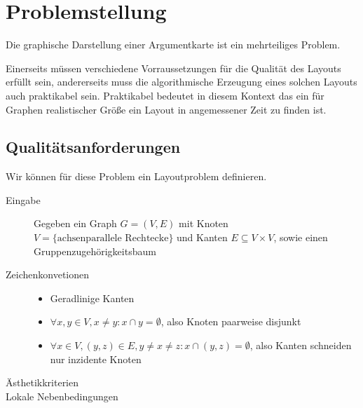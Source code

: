 \section{Problemstellung}
Die graphische Darstellung einer Argumentkarte ist ein mehrteiliges Problem.

Einerseits müssen verschiedene Vorraussetzungen für die Qualität des Layouts erfüllt sein, andererseits muss die algorithmische Erzeugung eines solchen Layouts auch praktikabel sein. Praktikabel bedeutet in diesem Kontext das ein für Graphen realistischer Größe ein Layout in angemessener Zeit zu finden ist.

\subsection{Qualitätsanforderungen}



Wir können für diese Problem ein Layoutproblem definieren.

\begin{description}
\item[Eingabe] Gegeben ein Graph $G=(V,E)$ mit Knoten $V = \{ \text{achsenparallele Rechtecke}\}$ und  Kanten $E \subseteq V \times V$,
sowie einen Gruppenzugehörigkeitsbaum 

\item[Zeichenkonvetionen]
	\begin{itemize}
	\item Geradlinige Kanten
	\item $\forall x,y\in V, x \neq y: x \cap y = \emptyset$, also Knoten paarweise disjunkt
	\item $\forall x \in V, (y,z) \in E, y\neq x\neq z: x \cap (y,z) = \emptyset$, also Kanten schneiden nur inzidente Knoten
	\end{itemize}

\item[Ästhetikkriterien]

\item[Lokale Nebenbedingungen]

\end{description}



	

